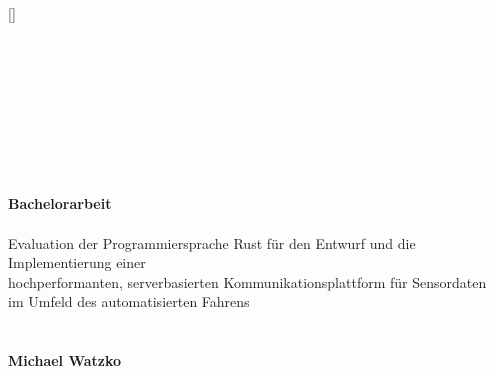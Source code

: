 

\newcommand{\setitle}{Bachelorarbeit}
\newcommand{\seauthor}{Michael Watzko}
\newcommand{\figurewidth}{0.66\textwidth}

\clearscrheadings
\clearscrplain

\pagestyle{scrheadings}	

\ihead[]{\leftmark}
\ohead[]{\rightmark}

\ifoot[]{}
\ofoot[\pagemark]{\pagemark}
\setheadsepline{.4pt}[\color{black}]


\begin{titlepage}
	\centering
	~\\ ~\\ 
	\vspace*{2em}
	~\\ %
	~\\ %
	 ~\\ ~\\ ~\\ ~\\
\textsf{\LARGE{
		\textbf{\setitle} ~\\ ~\\
		Evaluation der Programmiersprache Rust für den
		Entwurf und die Implementierung einer\\hochperformanten,
		serverbasierten Kommunikationsplattform für Sensordaten\\
		im Umfeld des automatisierten Fahrens
	}
	~\\ ~\\ ~\\
	\normalsize \textbf{Michael Watzko} \\
}
\end{titlepage}





